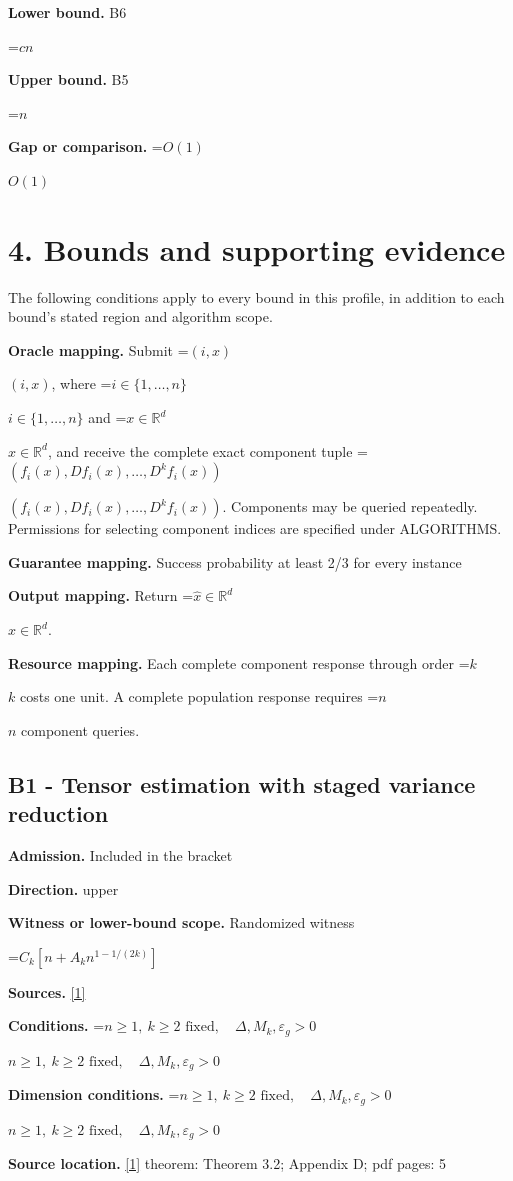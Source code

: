 \documentclass[10pt,a4paper]{article}
\newcommand{\AtlasMath}[1]{\par\begingroup\centering\setbox0=\hbox{$\displaystyle #1$}\ifdim\wd0>1.4\linewidth\typeout{ATLAS WIDE FORMULA: \the\wd0}\fi\ifdim\wd0>\linewidth\resizebox{\linewidth}{!}{\box0}\else\box0\fi\par\endgroup}
\newcommand{\AtlasInlineMath}[1]{\begingroup\setbox0=\hbox{$#1$}\ifdim\wd0>.4\linewidth\endgroup\AtlasMath{#1}\else\endgroup$#1$\fi}
\begin{document}
\textbf{Lower bound.} B6

\AtlasMath{cn}
\textbf{Upper bound.} B5

\AtlasMath{n}
\textbf{Gap or comparison.} \AtlasInlineMath{O(1)}

\section{4. Bounds and supporting evidence}
The following conditions apply to every bound in this profile, in addition to each bound's stated region and algorithm scope.

\textbf{Oracle mapping.} Submit \AtlasInlineMath{(i,x)}, where \AtlasInlineMath{i\in\{1,\ldots,n\}} and \AtlasInlineMath{x\in\mathbb{R}^d}, and receive the complete exact component tuple \AtlasInlineMath{(f_i(x),Df_i(x),\ldots,D^{k}f_i(x))}. Components may be queried repeatedly. Permissions for selecting component indices are specified under ALGORITHMS.

\textbf{Guarantee mapping.} Success probability at least 2/3 for every instance

\textbf{Output mapping.} Return \AtlasInlineMath{\widehat{x}\in \mathbb{R}^d}.

\textbf{Resource mapping.} Each complete component response through order \AtlasInlineMath{k} costs one unit. A complete population response requires \AtlasInlineMath{n} component queries.

\subsection{B1 - Tensor estimation with staged variance reduction}
\textbf{Admission.} Included in the bracket

\textbf{Direction.} upper

\textbf{Witness or lower-bound scope.} Randomized witness

\AtlasMath{C_k[n+A_kn^{1-1/(2k)}]}
\textbf{Sources.} \href{https://arxiv.org/pdf/2609.28202v2}{[1]}

\textbf{Conditions.} \AtlasInlineMath{n\ge1,\ k\ge2\text{ fixed},\quad\Delta,M_k,\varepsilon_g>0}

\textbf{Dimension conditions.} \AtlasInlineMath{n\ge1,\ k\ge2\text{ fixed},\quad\Delta,M_k,\varepsilon_g>0}

\textbf{Source location.} \href{https://arxiv.org/pdf/2609.28202v2}{[1]} theorem: Theorem 3.2; Appendix D; pdf pages: 5
\end{document}
